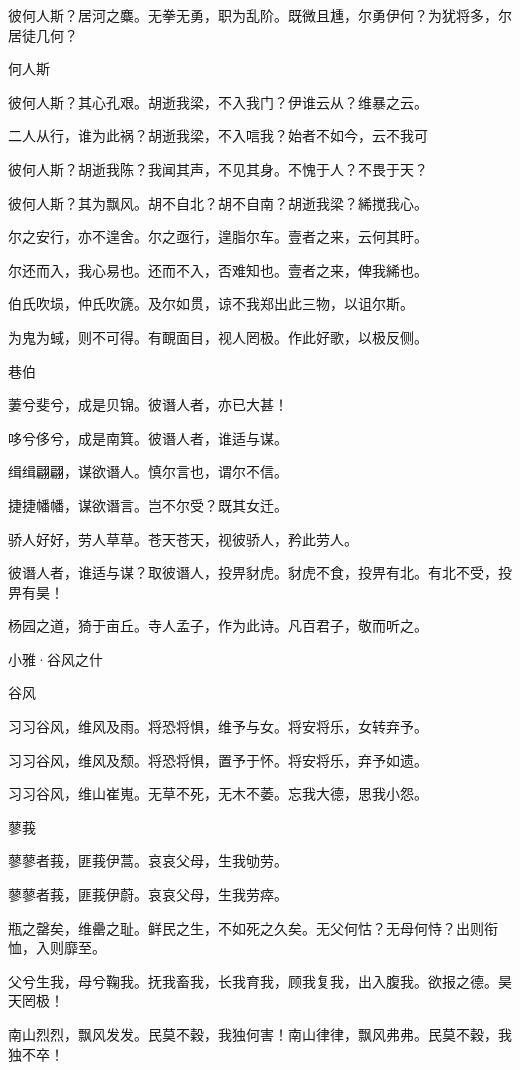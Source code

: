 彼何人斯？居河之麋。无拳无勇，职为乱阶。既微且尰，尔勇伊何？为犹将多，尔居徒几何？

何人斯

彼何人斯？其心孔艰。胡逝我梁，不入我门？伊谁云从？维暴之云。

二人从行，谁为此祸？胡逝我梁，不入唁我？始者不如今，云不我可

彼何人斯？胡逝我陈？我闻其声，不见其身。不愧于人？不畏于天？

彼何人斯？其为飘风。胡不自北？胡不自南？胡逝我梁？絺搅我心。

尔之安行，亦不遑舍。尔之亟行，遑脂尔车。壹者之来，云何其盱。

尔还而入，我心易也。还而不入，否难知也。壹者之来，俾我絺也。

伯氏吹埙，仲氏吹篪。及尔如贯，谅不我郑出此三物，以诅尔斯。

为鬼为蜮，则不可得。有靦面目，视人罔极。作此好歌，以极反侧。

巷伯

萋兮斐兮，成是贝锦。彼谮人者，亦已大甚！

哆兮侈兮，成是南箕。彼谮人者，谁适与谋。

缉缉翩翩，谋欲谮人。慎尔言也，谓尔不信。

捷捷幡幡，谋欲谮言。岂不尔受？既其女迁。

骄人好好，劳人草草。苍天苍天，视彼骄人，矜此劳人。

彼谮人者，谁适与谋？取彼谮人，投畀豺虎。豺虎不食，投畀有北。有北不受，投畀有昊！

杨园之道，猗于亩丘。寺人孟子，作为此诗。凡百君子，敬而听之。




小雅·谷风之什


谷风

习习谷风，维风及雨。将恐将惧，维予与女。将安将乐，女转弃予。

习习谷风，维风及颓。将恐将惧，置予于怀。将安将乐，弃予如遗。

习习谷风，维山崔嵬。无草不死，无木不萎。忘我大德，思我小怨。

蓼莪

蓼蓼者莪，匪莪伊蒿。哀哀父母，生我劬劳。

蓼蓼者莪，匪莪伊蔚。哀哀父母，生我劳瘁。

瓶之罄矣，维罍之耻。鲜民之生，不如死之久矣。无父何怙？无母何恃？出则衔恤，入则靡至。

父兮生我，母兮鞠我。抚我畜我，长我育我，顾我复我，出入腹我。欲报之德。昊天罔极！

南山烈烈，飘风发发。民莫不穀，我独何害！南山律律，飘风弗弗。民莫不穀，我独不卒！

